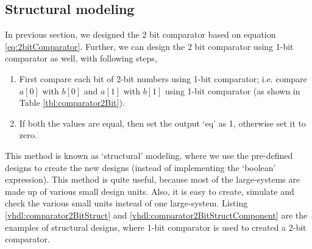 \subsection{Structural modeling}\label{sec:structureModeling}
In previous section, we designed the 2 bit comparator based on equation \ref{eq:2bitComparator}. Further, we can design the 2 bit comparator using 1-bit comparator as well, with following steps, 
\begin{enumerate}
	\item First compare each bit of 2-bit numbers using 1-bit comparator;  i.e. compare $a[0]$ with $b[0]$ and $a[1]$ with $b[1]$ using 1-bit comparator (as shown in Table \ref{tbl:comparator2Bit}). 
	
	\item If both the values are equal, then set the output `eq' as 1, otherwise set it to zero. 
\end{enumerate}

This method is known as `structural' modeling, where we use the pre-defined designs to create the new designs (instead of implementing the `boolean' expression). This method is quite useful, because most of the large-systems are made up of various small design units. Also, it is easy to create, simulate and check the various small units instead of one large-system. Listing \ref {vhdl:comparator2BitStruct} and \ref{vhdl:comparator2BitStructComponent} are the examples of structural designs, where 1-bit comparator is used to created a 2-bit comparator.  


